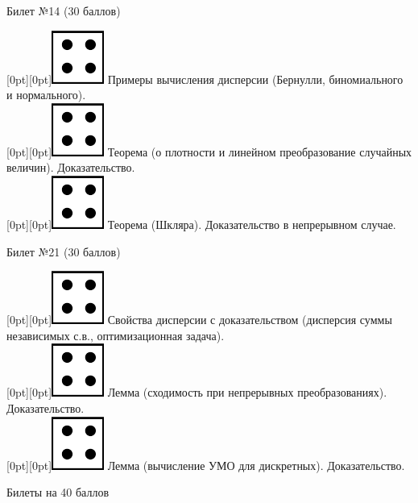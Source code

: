 \documentclass[10pt]{article}
\begin{document}
\begin{center} {\Large Билет №14 (30 баллов)} \end{center}

\raisebox{-1pt}[0pt][0pt]{\includegraphics[width=0.02\linewidth]{4.png}} Примеры вычисления дисперсии (Бернулли, биномиального и нормального). \\

\raisebox{-1pt}[0pt][0pt]{\includegraphics[width=0.02\linewidth]{4.png}} Теорема (о плотности и линейном преобразование случайных величин). Доказательство. \\

\raisebox{-1pt}[0pt][0pt]{\includegraphics[width=0.02\linewidth]{4.png}} Теорема (Шкляра). Доказательство в непрерывном случае. \\

\begin{center} {\Large Билет №21 (30 баллов)} \end{center}

\raisebox{-1pt}[0pt][0pt]{\includegraphics[width=0.02\linewidth]{4.png}} Свойства дисперсии с доказательством (дисперсия суммы независимых с.в., оптимизационная задача). \\ 

\raisebox{-1pt}[0pt][0pt]{\includegraphics[width=0.02\linewidth]{4.png}} Лемма  (сходимость при непрерывных преобразованиях). Доказательство. \\

\raisebox{-1pt}[0pt][0pt]{\includegraphics[width=0.02\linewidth]{4.png}} Лемма (вычисление УМО для дискретных). Доказательство. \\





\begin{center}

    Билеты на 40 баллов

\end{center}
\end{document}
